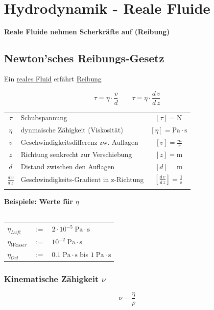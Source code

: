 \section{Hydrodynamik - Reale Fluide}

\textbf{Reale Fluide nehmen Scherkräfte auf (Reibung)}


\subsection{Newton'sches Reibungs-Gesetz}
Ein \underline{reales Fluid} erfährt \underline{Reibung} 

$$ \boxed{ \tau = \eta \cdot \frac{v}{d} }  \qquad  \boxed{ \tau = \eta \cdot \frac{d \, v}{d \, z} } $$

\begin{tabular}{c l c}
		$\tau$ & Schubspannung & $[\tau] = \mathrm{N}$ \\
		$\eta$ & dynmaische Zähigkeit (Viskosität) & $[\eta] = \mathrm{Pa \cdot s}$ \\
		\rule{0pt}{8pt}$v$ & Geschwindigkeitsdifferenz zw. Auflagen & $[v] = \frac{m}{s}$ \\
		$z$ & Richtung senkrecht zur Verschiebung & $[z] = \mathrm{m}$ \\
		$d$ & Distand zwischen den Auflagen & $[d] = \mathrm{m}$ \\
		\rule{0pt}{8pt}$\frac{d \, v}{d \, z}$ & Geschwindigkeits-Gradient in z-Richtung & $[\frac{d \, v}{d \, z}] = \mathrm{\frac{1}{s}}$ \\
		\\
\end{tabular}
	
\textbf{Beispiele: Werte für $\eta$} \\
\\
\begin{tabular}{l c l}
		$\eta_{Luft}$ & $:=$ & $2 \cdot 10^{-5} \; \mathrm{Pa \cdot s} $ \\
		$\eta_{Wasser}$ & $:=$ & $10^{-2} \; \mathrm{Pa \cdot s}$ \\
		$\eta_{Oel}$ & $:=$ & $0.1 \; \mathrm{Pa \cdot s}$ bis $1 \; \mathrm{Pa \cdot s}$ \\
\end{tabular}


\subsubsection{Kinematische Zähigkeit $\nu$}

$$ \boxed{ \nu = \frac{\eta}{\rho}  } $$

